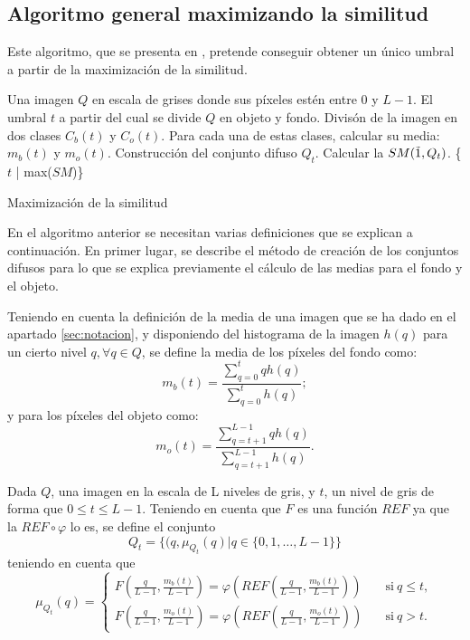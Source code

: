 
\subsection{Algoritmo general maximizando la similitud}

Este algoritmo, que se presenta en \cite{art:barrenechea}, pretende conseguir obtener un único umbral a partir de la maximización de la similitud. 

\begin{algorithm}
\begin{algorithmic}[1]
\REQUIRE Una imagen $Q$ en escala de grises donde sus píxeles estén entre $0$ y $L-1$.
\ENSURE El umbral $t$ a partir del cual se divide $Q$ en objeto y fondo.
\STATE Divisón de la imagen en dos clases $C_b(t)$ y $C_o(t)$. Para cada una de estas clases, calcular su media: $m_b(t)$ y $m_o(t)$.
\STATE Construcción del conjunto difuso $Q_t$.
\STATE Calcular la $SM(\tilda1, Q_t)$. \label{lin:alg1:similitud}
\ENDFOR
\RETURN \{$t$ | max($SM$)\}
\end{algorithmic}
\caption{Maximización de la similitud}\label{alg:algoritmo1}
\end{algorithm}

En el algoritmo anterior se necesitan varias definiciones que se explican a continuación. En primer lugar, se describe el método de creación de los conjuntos difusos para lo que se explica previamente el cálculo de las medias para el fondo y el objeto.

\begin{definition}\label{def:mediasmonoumbral}
Teniendo en cuenta la definición de la media de una imagen que se ha dado en el apartado \ref{sec:notacion}, y disponiendo del histograma de la imagen $h(q)$ para un cierto nivel $q, \forall q\in Q$, se define la media de los píxeles del fondo como:
$$m_b(t)=\frac{\sum_{q=0}^{t}qh(q)}{\sum_{q=0}^{t}h(q)};$$
y para los píxeles del objeto como:
$$m_o(t)=\frac{\sum_{q=t+1}^{L-1}qh(q)}{\sum_{q=t+1}^{L-1}h(q)}.$$
\end{definition}

\begin{definition}\label{def:conjuntodifusomonoumbral}
Dada $Q$, una imagen en la escala de L niveles de gris, y $t$, un nivel de gris de forma que $0\leq t\leq L-1$. Teniendo en cuenta que $F$ es una función $REF$ ya que la $REF \circ \varphi$ lo es, se define el conjunto
$$Q_t = \{(q, \mu_{Q_t}(q)|q\in \{0,1,\dots, L-1\}\}$$ 
teniendo en cuenta que
$$\mu_{Q_t}(q) = \left\{ \begin{aligned}
    F \left(\frac{q}{L-1}, \frac{m_b(t)}{L-1} \right) = \varphi\left(REF\left(\frac{q}{L-1}, \frac{m_b(t)}{L-1} \right)\right) & \quad\text{si}\ q\leq t,\\
    F \left(\frac{q}{L-1}, \frac{m_o(t)}{L-1} \right) = \varphi\left(REF\left(\frac{q}{L-1}, \frac{m_o(t)}{L-1} \right)\right) & \quad\text{si}\ q> t.
 \end{aligned}\right.$$
 \end{definition}

